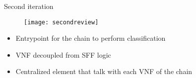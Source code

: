 \begin{frame}{Second iteration}

  \vspace{-0.5cm}

  \begin{figure}
    \centering
    \texttt{[image: secondreview]}
  \end{figure}

  \vspace{0.2cm}

  \begin{itemize}
    \item Entrypoint for the chain to perform classification
    \item VNF decoupled from SFF logic
    \item Centralized element that talk with each VNF of the chain
  \end{itemize}

\end{frame}